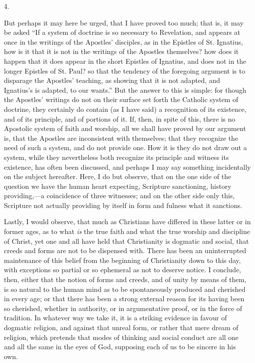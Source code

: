 4.

But perhaps it may here be urged, that I have proved too much; that
is, it may be asked ``If a system of doctrine is so necessary to
Revelation, and appears at once in the writings of the Apostles'
disciples, as in the Epistles of St. Ignatius, how is it that it is
not in the writings of the Apostles themselves? how does it happen
that it does appear in the short Epistles of Ignatius, and does not in
the longer Epistles of St. Paul? so that the tendency of the foregoing
argument is to disparage the Apostles' teaching, as showing that it is
not adapted, and Ignatius's is adapted, to our wants.'' But the
answer to this is simple: for though the Apostles' writings do not on
their surface set forth the Catholic system of doctrine, they
certainly do contain (as I have said) a recognition of its existence,
and of its principle, and of portions of it. If, then, in spite of
this, there is no Apostolic system of faith and worship, all we shall
have proved by our argument is, that the Apostles are inconsistent
with themselves; that they recognize the need of such a system, and do
not provide one. How it is they do not draw out a system, while they
nevertheless both recognize its principle and witness its existence,
has often been discussed, and perhaps I may say something incidentally
on the subject hereafter. Here, I do but observe, that on the
one side of the question we have the human heart expecting, Scripture
sanctioning, history providing,—a coincidence of three witnesses;
and on the other side only this, Scripture not actually providing by
itself in form and fulness what it sanctions.

Lastly, I would observe, that much as Christians have differed in
these latter or in former ages, as to what \emph{is} the true faith and what
the true worship and discipline of Christ, yet one and all have held
that Christianity is dogmatic and social, that creeds and forms are
not to be dispensed with. There has been an uninterrupted maintenance
of this belief from the beginning of Christianity down to this day,
with exceptions so partial or so ephemeral as not to deserve notice. I
conclude, then, either that the notion of forms and creeds, and of
unity by means of them, is so natural to the human mind as to be
spontaneously produced and cherished in every age; or that there has
been a strong external reason for its having been so cherished,
whether in authority, or in argumentative proof, or in the force of
tradition. In whatever way we take it, it is a striking evidence in
favour of dogmatic religion, and against that unreal form, or rather
that mere dream of religion, which pretends that modes of thinking and
social conduct are all one and all the same in the eyes of God,
supposing each of us to be sincere in his own.

